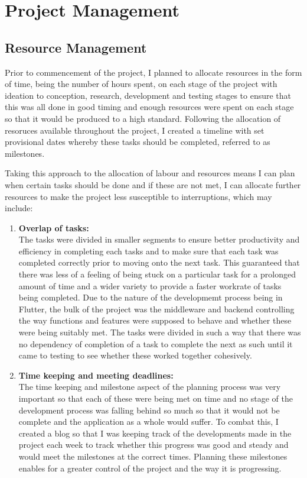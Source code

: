\documentclass[oneside]{report}
\begin{document}
\chapter{Project Management}

	\section{Resource Management}
Prior to commencement of the project, I planned to allocate resources in the form of time, being the number of hours spent, on each stage of the project with ideation to conception, research, development and testing stages to ensure that this was all done in good timing and enough resources were spent on each stage so that it would be produced to a high standard. Following the allocation of resoruces available throughout the project, I created a timeline with set provisional dates whereby these tasks should be completed, referred to as milestones.

Taking this approach to the allocation of labour and resources means I can plan when certain tasks should be done and if these are not met, I can allocate further resources to make the project less susceptible to interruptions, which may include:

\begin{enumerate}
\item \textbf{Overlap of tasks:}\\
The tasks were divided in smaller segments to ensure better productivity and efficiency in completing each tasks and to make sure that each task was completed correctly prior to moving onto the next task. This guaranteed that there was less of a feeling of  being stuck on a particular task for a prolonged amount of time and a wider variety to provide a faster workrate of tasks being completed. Due to the nature of the developmemt process being in Flutter, the bulk of the project was the middleware and backend controlling the way functions and features were supposed to behave and whether these were being suitably met. The tasks were divided in such a way that there was no dependency of completion of a task to complete the next as such until it came to testing to see whether these worked together cohesively.
\item \textbf{Time keeping and meeting deadlines:}\\
The time keeping and milestone aspect of the planning process was very important so that each of these were being met on time and no stage of the development process was falling behind so much so that it would not be complete and the application as a whole would suffer. To combat this, I created a blog so that I was keeping track of the developments made in the project each week to track whether this progress was good and steady and would meet the milestones at the correct times. Planning these milestones enables for a greater control of the project and the way it is progressing.
\end{enumerate}
\end{document}
